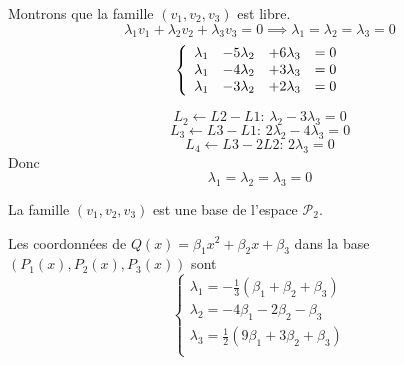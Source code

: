 \documentclass[]{book}
\theoremstyle{definition}
\begin{document}
Montrons que la famille $(v_1,v_2,v_3)$ est libre.
$$
\lambda_1 v_{1} +\lambda_2 v_{2} +\lambda_3 v_{3} = 0
\implies
\lambda_1=\lambda_2=\lambda_3=0
$$
$$
\left\{ 
\begin{array}{l l l l}
\lambda_1 & -5\lambda_2 & +6\lambda_3 & = 0 \\
\lambda_1 & -4\lambda_2 & +3\lambda_3 & = 0 \\
\lambda_1 & -3\lambda_2 & +2\lambda_3 & = 0 \\
\end{array}
\right. 
$$

$$L_2 \leftarrow L2-L1:\, \lambda_2 -3\lambda_3 = 0$$
$$L_3 \leftarrow L3-L1:\, 2\lambda_2 -4\lambda_3 = 0$$
$$L_4 \leftarrow L3-2L2:\, 2\lambda_3 = 0$$
Donc
$$
\lambda_1=\lambda_2=\lambda_3=0
$$

La famille $(v_1,v_2,v_3)$ est une base de l'espace $\mathcal{P}_2$.

Les coordonn\'ees de $Q(x) = \beta_1 x^2 + \beta_2 x + \beta_3$ dans la base $(P_1(x),P_2(x),P_3(x))$ sont
$$
\left\{ 
\begin{array}{l}
\lambda_1 = -\frac{1}{3}(\beta_1 + \beta_2 + \beta_3) \\
\lambda_2 = -4\beta_1 - 2\beta_2 - \beta_3 \\
\lambda_3 = \frac{1}{2}(9\beta_1 + 3\beta_2 + \beta_3) \\
\end{array}
\right. 
$$
\end{document}
